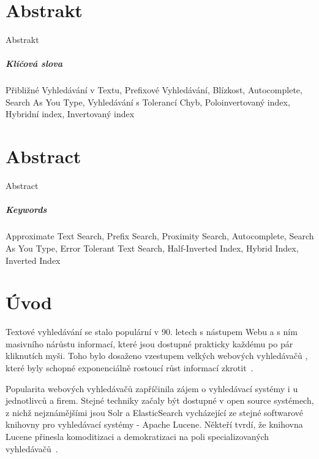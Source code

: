 \documentclass[11pt,letterpaper,oneside,openright]{book}
\begin{document}
\newpage
\chapter*{Abstrakt}
Abstrakt
\paragraph{Klíčová slova}
Přibližné Vyhledávání v Textu, Prefixové Vyhledávání, Blízkost, Autocomplete, Search As You Type, Vyhledávání s Tolerancí Chyb, Poloinvertovaný index, Hybridní index, Invertovaný index

\newpage
\chapter*{Abstract}
Abstract
\paragraph{Keywords}
Approximate Text Search, Prefix Search, Proximity Search, Autocomplete, Search As You Type, Error Tolerant Text Search, Half-Inverted Index, Hybrid Index, Inverted Index


\newpage
{\hypersetup{hidelinks}
    \tableofcontents
}

\mainmatter
\chapter{Úvod}
Textové vyhledávání se stalo populární v 90. letech s nástupem Webu a s ním
masivního nárůstu informací, které jsou dostupné prakticky každému po pár
kliknutích myši. Toho bylo dosaženo vzestupem velkých webových vyhledávačů ,
které byly schopné exponenciálně rostoucí růst informací
zkrotit~\cite{search_history}.


Popularita webových vyhledávačů zapříčinila zájem o vyhledávací systémy i u
jednotlivců a firem. Stejné techniky začaly být dostupné v open source
systémech, z nichž nejznámějšími jsou Solr a ElasticSearch vycházející ze
stejné softwarové knihovny pro vyhledávací systémy - Apache Lucene. Někteří
tvrdí, že knihovna Lucene přinesla komoditizaci a demokratizaci na poli
specializovaných vyhledávačů~\cite{dion_almaer,javaworld}.
\end{document}
